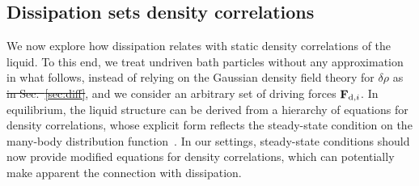 \documentclass[superscriptaddress, twocolumn, prx, longbibliography, nofootinbib]{revtex4-1}
\providecommand{\DIFaddtex}[1]{{\protect\color{blue}\uwave{#1}}} %
\providecommand{\DIFdeltex}[1]{{\protect\color{red}\sout{#1}}}                      %
\providecommand{\DIFaddbegin}{} %
\providecommand{\DIFaddend}{} %
\providecommand{\DIFdelbegin}{} %
\providecommand{\DIFdelend}{} %
\providecommand{\DIFadd}[1]{\texorpdfstring{\DIFaddtex{#1}}{#1}} %
\providecommand{\DIFdel}[1]{\texorpdfstring{\DIFdeltex{#1}}{}} %
\begin{document}


\subsection{Dissipation sets density correlations}\label{sec:struc}

We now explore how dissipation relates with static density correlations of the liquid. To this end, we treat undriven bath particles without any approximation in what follows, instead of relying on the Gaussian density field theory for $\delta\rho$ as \DIFdelbegin \DIFdel{in Sec.~\ref{sec:diff}}\DIFdelend \DIFaddbegin \DIFadd{we did above}\DIFaddend , and we consider an arbitrary set of driving forces ${\bf F}_{{\rm d},i}$. In equilibrium, the liquid structure can be derived from a hierarchy of equations for density correlations, whose explicit form reflects the steady-state condition on the many-body distribution function~\cite{Hansen2013}. In our settings, steady-state conditions should now provide modified equations for density correlations, which can potentially make apparent the connection with dissipation.
\end{document}
